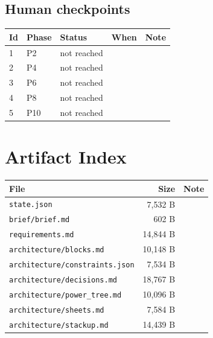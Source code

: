 \documentclass[11pt,a4paper]{article}
\begin{document}
\subsection*{Human checkpoints}
{\small
\begin{longtable}{lllp{2.6cm}p{6.4cm}}
\toprule
\textbf{Id} & \textbf{Phase} & \textbf{Status} & \textbf{When} & \textbf{Note} \\
\midrule
\endhead
1 & P2 & not reached &  &  \\
2 & P4 & not reached &  &  \\
3 & P6 & not reached &  &  \\
4 & P8 & not reached &  &  \\
5 & P10 & not reached &  &  \\
\bottomrule
\end{longtable}
}
\section{Artifact Index}
{\small
\begin{longtable}{p{9cm}rp{4cm}}
\toprule
\textbf{File} & \textbf{Size} & \textbf{Note} \\
\midrule
\endhead
\texttt{state.json} & 7,532 B &  \\
\texttt{brief/brief.md} & 602 B &  \\
\texttt{requirements.md} & 14,844 B &  \\
\texttt{architecture/blocks.md} & 10,148 B &  \\
\texttt{architecture/constraints.json} & 7,534 B &  \\
\texttt{architecture/decisions.md} & 18,767 B &  \\
\texttt{architecture/power\_tree.md} & 10,096 B &  \\
\texttt{architecture/sheets.md} & 7,584 B &  \\
\texttt{architecture/stackup.md} & 14,439 B &  \\
\bottomrule
\end{longtable}
}
\end{document}
